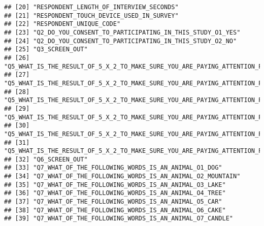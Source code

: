 \documentclass[
]{article}
\begin{document}
\begin{verbatim}
## [20] "RESPONDENT_LENGTH_OF_INTERVIEW_SECONDS"                                                                                      
## [21] "RESPONDENT_TOUCH_DEVICE_USED_IN_SURVEY"                                                                                      
## [22] "RESPONDENT_UNIQUE_CODE"                                                                                                      
## [23] "Q2_DO_YOU_CONSENT_TO_PARTICIPATING_IN_THIS_STUDY_O1_YES"                                                                     
## [24] "Q2_DO_YOU_CONSENT_TO_PARTICIPATING_IN_THIS_STUDY_O2_NO"                                                                      
## [25] "Q3_SCREEN_OUT"                                                                                                               
## [26] "Q5_WHAT_IS_THE_RESULT_OF_5_X_2_TO_MAKE_SURE_YOU_ARE_PAYING_ATTENTION_PLEASE_SELECT_THE_OPTION_NONE_OF_T_O1_10"               
## [27] "Q5_WHAT_IS_THE_RESULT_OF_5_X_2_TO_MAKE_SURE_YOU_ARE_PAYING_ATTENTION_PLEASE_SELECT_THE_OPTION_NONE_OF_T_O2_7"                
## [28] "Q5_WHAT_IS_THE_RESULT_OF_5_X_2_TO_MAKE_SURE_YOU_ARE_PAYING_ATTENTION_PLEASE_SELECT_THE_OPTION_NONE_OF_T_O3_12"               
## [29] "Q5_WHAT_IS_THE_RESULT_OF_5_X_2_TO_MAKE_SURE_YOU_ARE_PAYING_ATTENTION_PLEASE_SELECT_THE_OPTION_NONE_OF_T_O4_5"                
## [30] "Q5_WHAT_IS_THE_RESULT_OF_5_X_2_TO_MAKE_SURE_YOU_ARE_PAYING_ATTENTION_PLEASE_SELECT_THE_OPTION_NONE_OF_T_O5_8"                
## [31] "Q5_WHAT_IS_THE_RESULT_OF_5_X_2_TO_MAKE_SURE_YOU_ARE_PAYING_ATTENTION_PLEASE_SELECT_THE_OPTION_NONE_OF_T_O6_NONE_OF_THE_ABOVE"
## [32] "Q6_SCREEN_OUT"                                                                                                               
## [33] "Q7_WHAT_OF_THE_FOLLOWING_WORDS_IS_AN_ANIMAL_O1_DOG"                                                                          
## [34] "Q7_WHAT_OF_THE_FOLLOWING_WORDS_IS_AN_ANIMAL_O2_MOUNTAIN"                                                                     
## [35] "Q7_WHAT_OF_THE_FOLLOWING_WORDS_IS_AN_ANIMAL_O3_LAKE"                                                                         
## [36] "Q7_WHAT_OF_THE_FOLLOWING_WORDS_IS_AN_ANIMAL_O4_TREE"                                                                         
## [37] "Q7_WHAT_OF_THE_FOLLOWING_WORDS_IS_AN_ANIMAL_O5_CAR"                                                                          
## [38] "Q7_WHAT_OF_THE_FOLLOWING_WORDS_IS_AN_ANIMAL_O6_CAKE"                                                                         
## [39] "Q7_WHAT_OF_THE_FOLLOWING_WORDS_IS_AN_ANIMAL_O7_CANDLE"                                                                       

\end{verbatim}
\end{document}
